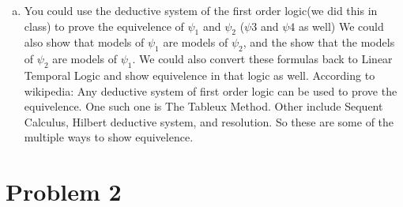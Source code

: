 \documentclass[11pt,leqno,fleqn]{article}
\begin{document}
\begin{enumerate}[(a)]
 \item You could use the deductive system of the first order logic(we did this in class) to prove the equivelence of $\psi_1$ and $\psi_2$  ($\psi3$ and $\psi 4$ as well)
  We could also show that models of $\psi_1$ are models of $\psi_2$, and the show that the models of $\psi_2$ are models of $\psi_1$.
  We could also convert these formulas back to Linear Temporal Logic and show equivelence in that logic as well.
 According to wikipedia: Any deductive system of first order logic can be used to prove the equivelence. One such one is  The Tableux Method. Other include  Sequent Calculus, Hilbert deductive system, and resolution.
 So these are some of the multiple ways to show equivelence.
\end{enumerate}

\newpage
\section{Problem 2}
\end{document}
